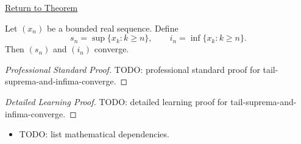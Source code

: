 \newpage
{}
\label{prf:tail-suprema-infima-converge}

\begin{remark*}[Return]
\hyperref[thm:tail-suprema-infima-converge]{Return to Theorem}
\end{remark*}

\begin{theorem*}
Let $(x_n)$ be a bounded real sequence. Define
\[
  s_n=\sup\{x_k:k\ge n\},
  \qquad
  i_n=\inf\{x_k:k\ge n\}.
\]
Then $(s_n)$ and $(i_n)$ converge.

\smallskip
\noindent
\end{theorem*}

\begin{proof}[Professional Standard Proof]
\LRAProofBodyStart
TODO: professional standard proof for tail-suprema-and-infima-converge.
\end{proof}

\begin{proof}[Detailed Learning Proof]
\LRAProofBodyStart
TODO: detailed learning proof for tail-suprema-and-infima-converge.
\end{proof}

\begin{remark*}
\end{remark*}

\begin{dependencies}
\begin{itemize}
  \item TODO: list mathematical dependencies.
\end{itemize}
\end{dependencies}

\clearpage
